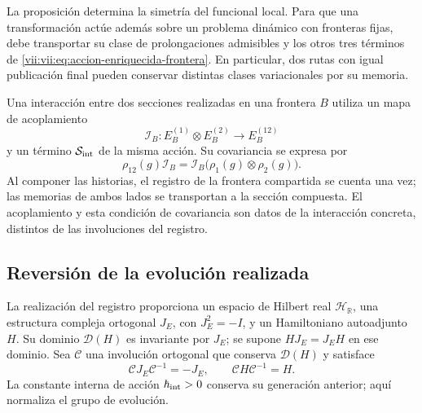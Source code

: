 La proposición determina la simetría del funcional local. Para que una
transformación actúe además sobre un problema dinámico con fronteras fijas,
debe transportar su clase de prolongaciones admisibles y los otros tres
términos de \eqref{vii:vii:eq:accion-enriquecida-frontera}. En particular, dos
rutas con igual publicación final pueden conservar distintas clases
variacionales por su memoria.

Una interacción entre dos secciones realizadas en una frontera \(B\)
utiliza un mapa de acoplamiento
\[
 \mathcal I_B:E_B^{(1)}\otimes E_B^{(2)}\longrightarrow E_B^{(12)}
\]
y un término \(\mathcal S_{\rm int}\) de la misma acción. Su covariancia
se expresa por
\[
 \rho_{12}(g)\mathcal I_B
 =\mathcal I_B\bigl(\rho_1(g)\otimes\rho_2(g)\bigr).
\]
Al componer las historias, el registro de la frontera compartida se cuenta
una vez; las memorias de ambos lados se transportan a la sección compuesta.
El acoplamiento y esta condición de covariancia son datos de la interacción
concreta, distintos de las involuciones del registro.

\subsection{Reversión de la evolución realizada}
\label{vii:vii:subsec:reversion-evolucion}

La realización del registro proporciona un espacio de Hilbert real
\(\mathcal H_{\mathbb R}\), una estructura compleja ortogonal
\(J_E\), con \(J_E^2=-I\), y un Hamiltoniano autoadjunto \(H\).
Su dominio \(\mathcal D(H)\) es invariante por \(J_E\); se supone
\(HJ_E=J_EH\) en ese dominio. Sea \(\mathcal C\) una involución
ortogonal que conserva \(\mathcal D(H)\) y satisface
\begin{equation}
 \mathcal C J_E\mathcal C^{-1}=-J_E,\qquad
 \mathcal C H\mathcal C^{-1}=H.
 \label{vii:vii:eq:dominio-reversion-evolucion}
\end{equation}
La constante interna de acción \(\hbar_{\rm int}>0\) conserva su
generación anterior; aquí normaliza el grupo de evolución.

